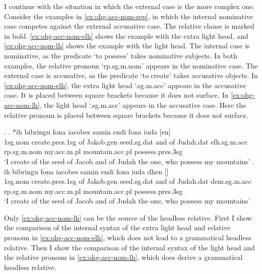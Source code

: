 I continue with the situation in which the external case is the more complex one.
Consider the examples in \ref{ex:ohg-acc-nom-rep}, in which the internal nominative case competes against the external accusative case. The relative clause is marked in bold. \ref{ex:ohg-acc-nom-elh} shows the example with the extra light head, and \ref{ex:ohg-acc-nom-lh} shows the example with the light head.
The internal case is nominative, as the predicate  `to possess' takes nominative subjects.
In both examples, the relative pronoun  `\ac{rp}.\ac{sg}.\ac{m}.\ac{nom}' appears in the nominative case.
The external case is accusative, as the predicate  `to create' takes accusative objects.
In \ref{ex:ohg-acc-nom-elh}, the extra light head  `.\ac{sg}.\ac{m}.\ac{acc}' appears in the accusative case. It is placed between square brackets because it does not surface.
In \ref{ex:ohg-acc-nom-lh}, the light head  `.\ac{sg}.\ac{m}.\ac{acc}' appears in the accusative case. Here the relative pronoun is placed between square brackets because it does not surface.

\ex.\label{ex:ohg-acc-nom-rep}
\ag. *ih bibringu fona iacobes samin endi fona iuda [en]    \\
1\ac{sg}.\ac{nom} {create}.\ac{pres}.1\ac{sg}\scsub{[acc]} of Jakob.\ac{gen} seed.\ac{sg}.\ac{dat} and of Judah.\ac{dat} \ac{elh}.\ac{sg}.\ac{m}.\ac{acc} \ac{rp}.\ac{sg}.\ac{m}.\ac{nom} my.\ac{acc}.\ac{m}.\ac{pl} mountain.\ac{acc}.\ac{pl} possess.\ac{pres}.3\ac{sg}\scsub{[nom]}\\
`I create of the seed of Jacob and of Judah the one, who possess my mountains' \label{ex:ohg-acc-nom-elh}
\bg. ih bibringu fona iacobes samin endi fona iuda dhen []   \\
1\ac{sg}.\ac{nom} {create}.\ac{pres}.1\ac{sg}\scsub{[acc]} of Jakob.\ac{gen} seed.\ac{sg}.\ac{dat} and of Judah.\ac{dat} \ac{dem}.\ac{sg}.\ac{m}.\ac{acc} \ac{rp}.\ac{sg}.\ac{m}.\ac{nom} my.\ac{acc}.\ac{m}.\ac{pl} mountain.\ac{acc}.\ac{pl} possess.\ac{pres}.3\ac{sg}\scsub{[nom]}\\
`I create of the seed of Jacob and of Judah the one, who possess my mountains' \label{ex:ohg-acc-nom-lh}

Only \ref{ex:ohg-acc-nom-lh} can be the source of the headless relative. First I show the comparison of the internal syntax of the extra light head and relative pronoun in \ref{ex:ohg-acc-nom-elh}, which does not lead to a grammatical headless relative. Then I show the comparison of the internal syntax of the light head and the relative pronoun in \ref{ex:ohg-acc-nom-lh}, which does derive a grammatical headless relative.

